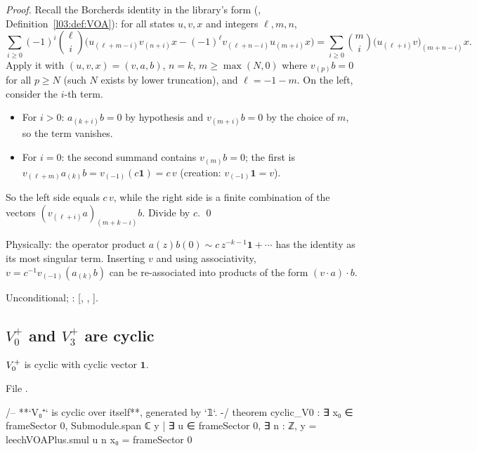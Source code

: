 \emph{Proof.}  Recall the Borcherds identity in the library's form
(, Definition~\ref{l03:def:VOA}): for all states $u,v,x$ and integers
$\ell,m,n$,
\begin{equation}\label{ch11:eq:borcherds}
  \sum_{i\ge0}(-1)^i\binom{\ell}{i}\Big(u_{(\ell+m-i)}v_{(n+i)}x-(-1)^\ell v_{(\ell+n-i)}u_{(m+i)}x\Big)
  =\sum_{i\ge0}\binom{m}{i}\big(u_{(\ell+i)}v\big)_{(m+n-i)}x .
\end{equation}
Apply it with $(u,v,x)=(v,a,b)$, $n=k$, $m\ge\max(N,0)$ where $v_{(p)}b=0$ for all $p\ge N$ (such
$N$ exists by lower truncation), and $\ell=-1-m$.  On the left, consider the $i$-th term.
\begin{itemize}
  \item For $i>0$: $a_{(k+i)}b=0$ by hypothesis and $v_{(m+i)}b=0$ by the choice of $m$, so the term
  vanishes.
  \item For $i=0$: the second summand contains $v_{(m)}b=0$; the first is
  $v_{(\ell+m)}a_{(k)}b=v_{(-1)}(c\mathbf 1)=c\,v$ (creation: $v_{(-1)}\mathbf 1=v$).
\end{itemize}
So the left side equals $c\,v$, while the right side is a finite combination of the vectors
$(v_{(\ell+i)}a)_{(m+k-i)}b$.  Divide by $c$. \qed

Physically: the operator product $a(z)b(0)\sim c\,z^{-k-1}\mathbf 1+\cdots$ has the identity as its
most singular term.  Inserting $v$ and using associativity, $v=c^{-1}v_{(-1)}(a_{(k)}b)$ can be
re-associated into products of the form $(v\cdot a)\cdot b$.
\begin{status}Unconditional; : [,
, ].\end{status}

\subsection{\texorpdfstring{$V_0^+$ and $V_3^+$}{V0+ and V3+} are cyclic}

\begin{theorem}\label{ch11:thm:cyclicV0}
$V_0^{+}$ is cyclic with cyclic vector $\mathbf 1$.
\end{theorem}
\noindent File .
\begin{leancode}
/-- **`V₀⁺` is cyclic over itself**, generated by `𝟙`. -/
theorem cyclic_V0 : ∃ x₀ ∈ frameSector 0,
    Submodule.span ℂ {y | ∃ u ∈ frameSector 0, ∃ n : ℤ, y = leechVOAPlus.smul u n x₀}
      = frameSector 0
\end{leancode}


